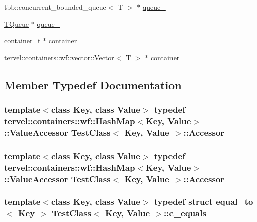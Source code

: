 \begin{DoxyCompactItemize}
\item 
tbb\+::concurrent\+\_\+bounded\+\_\+queue$<$ T $>$ $\ast$ \hyperlink{class_test_class_a165f4022d46081c8594106c0247cfef3}{queue\+\_\+}
\item 
\hyperlink{class_test_class_ae96e169a6dee97fddd6acfc655497f0c}{T\+Queue} $\ast$ \hyperlink{class_test_class_a6d2a5cb3e074be536e9637e3898a66c7}{queue\+\_\+}
\item 
\hyperlink{class_test_class_abe640a96ccd2edb9a09ad292c8a8b298}{container\+\_\+t} $\ast$ \hyperlink{class_test_class_abe4e24c68b92dd93f411f3b7e62e8cde}{container}
\item 
tervel\+::containers\+::wf\+::vector\+::\+Vector$<$ T $>$ $\ast$ \hyperlink{class_test_class_a188a7b0e4dba55a763a64328e9015d5d}{container}
\end{DoxyCompactItemize}


\subsection{Member Typedef Documentation}
\hypertarget{class_test_class_a0af9e93839a0717ed717ab4818353762}{}
\subsubsection[{Accessor}]{\setlength{\rightskip}{0pt plus 5cm}template$<$class Key, class Value$>$ typedef {\bf tervel\+::containers\+::wf\+::\+Hash\+Map}$<$Key, {\bf Value}$>$\+::Value\+Accessor {\bf Test\+Class}$<$ Key, {\bf Value} $>$\+::{\bf Accessor}}\label{class_test_class_a0af9e93839a0717ed717ab4818353762}
\hypertarget{class_test_class_a0af9e93839a0717ed717ab4818353762}{}
\subsubsection[{Accessor}]{\setlength{\rightskip}{0pt plus 5cm}template$<$class Key, class Value$>$ typedef {\bf tervel\+::containers\+::wf\+::\+Hash\+Map}$<$Key, {\bf Value}$>$\+::Value\+Accessor {\bf Test\+Class}$<$ Key, {\bf Value} $>$\+::{\bf Accessor}}\label{class_test_class_a0af9e93839a0717ed717ab4818353762}
\hypertarget{class_test_class_aafbd6570cd1aa88768f912c15ca188b5}{}
\subsubsection[{c\+\_\+equals}]{\setlength{\rightskip}{0pt plus 5cm}template$<$class Key, class Value$>$ typedef struct {\bf equal\+\_\+to}$<$ Key $>$ {\bf Test\+Class}$<$ Key, {\bf Value} $>$\+::{\bf c\+\_\+equals}\hspace{0.3cm}{\ttfamily [private]}}\label{class_test_class_aafbd6570cd1aa88768f912c15ca188b5}
\hypertarget{class_test_class_aafbd6570cd1aa88768f912c15ca188b5}{}
